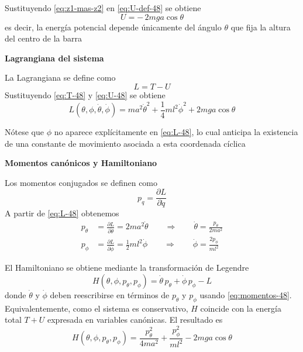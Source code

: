 \documentclass{article}
\begin{document}
Sustituyendo \eqref{eq:z1-mas-z2} en \eqref{eq:U-def-48} se obtiene
\begin{equation}
U
= -\,2 m g a\cos\theta
\label{eq:U-48}
\end{equation}
es decir, la energía potencial depende únicamente del ángulo $\theta$ que fija
la altura del centro de la barra

\textcolor{trueblue}{\textbf{Lagrangiana del sistema}}

La Lagrangiana se define como
\[
L = T - U
\]
Sustituyendo \eqref{eq:T-48} y \eqref{eq:U-48} se obtiene
\begin{equation}
L(\theta,\phi,\dot\theta,\dot\phi)
= m a^{2}\dot\theta^{2}
+ \frac{1}{4}m l^{2}\dot\phi^{2}
+ 2 m g a\cos\theta
\label{eq:L-48}
\end{equation}

Nótese que $\phi$ no aparece explícitamente en \eqref{eq:L-48}, lo cual
anticipa la existencia de una constante de movimiento asociada a esta
coordenada cíclica

\textcolor{trueblue}{\textbf{Momentos canónicos y Hamiltoniano}}

Los momentos conjugados se definen como
\[
p_{q} = \frac{\partial L}{\partial\dot q}
\]
A partir de \eqref{eq:L-48} obtenemos
\begin{equation}
\begin{split}
p_{\theta}
&= \frac{\partial L}{\partial\dot\theta}
 = 2 m a^{2}\dot\theta
 \qquad\Rightarrow\qquad
 \dot\theta = \frac{p_{\theta}}{2 m a^{2}} \\[6pt]
p_{\phi}
&= \frac{\partial L}{\partial\dot\phi}
 = \frac{1}{2}m l^{2}\dot\phi
 \qquad\Rightarrow\qquad
 \dot\phi = \frac{2 p_{\phi}}{m l^{2}}
\end{split}
\label{eq:momentos-48}
\end{equation}

El Hamiltoniano se obtiene mediante la transformación de Legendre
\begin{equation}
H(\theta,\phi,p_{\theta},p_{\phi})
= \dot\theta\,p_{\theta} + \dot\phi\,p_{\phi} - L
\label{eq:H-Legendre-48}
\end{equation}
donde $\dot\theta$ y $\dot\phi$ deben reescribirse en términos de
$p_{\theta}$ y $p_{\phi}$ usando \eqref{eq:momentos-48}. Equivalentemente,
como el sistema es conservativo, $H$ coincide con la energía total $T+U$
expresada en variables canónicas. El resultado es
\begin{equation}
H(\theta,\phi,p_{\theta},p_{\phi})
=
\frac{p_{\theta}^{2}}{4 m a^{2}}
+ \frac{p_{\phi}^{2}}{m l^{2}}
- 2 m g a\cos\theta
\label{eq:H-48}
\end{equation}
\end{document}
